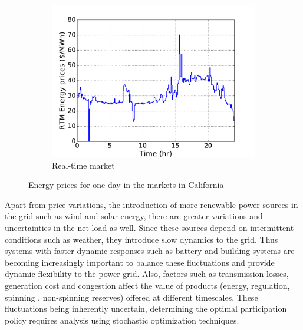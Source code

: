 \documentclass[11pt,twoside]{article}
\begin{document}
\begin{figure}[h!tp]
\begin{subfigure}[b]{0.32\textwidth} \includegraphics[width=\textwidth]{Figures/rtmprices.pdf} \caption{Real-time market}\label{rtmprices}\end{subfigure} \hfill
\caption{Energy prices for one day in the markets in California}\label{eprices}
\end{figure}

Apart from price variations, the introduction of more renewable power sources in the grid such as wind and solar energy, there are greater variations and uncertainties in the net load as well. Since these sources depend on intermittent conditions such as weather, they introduce slow dynamics to the grid. Thus systems with faster dynamic responses such as battery and building systems are becoming increasingly important to balance these fluctuations and provide dynamic flexibility to the power grid. Also, factors such as transmission losses, generation cost and congestion affect the value of products (energy, regulation, spinning , non-spinning reserves) offered at different timescales. These fluctuations being inherently uncertain, determining the optimal participation policy requires analysis using stochastic optimization techniques.
\end{document}
